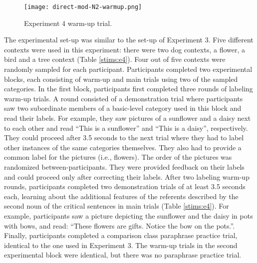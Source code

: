 \begin{figure*}[t]
	\begin{center}
		\texttt{[image: direct-mod-N2-warmup.png]}
	\end{center}
	\vspace{-0.3cm}
	\caption{Experiment 4 warm-up trial.}
	\label{double-mod-N2warmup}
\end{figure*} 
The experimental set-up was similar  to the set-up of Experiment 3. Five different contexts were used in this experiment: there were two dog contexts, a flower, a bird and a tree context (Table \ref{stims:e4}). Four out of five contexts were randomly sampled for each participant.  Participants completed two experimental blocks, each consisting of warm-up and main trials using two of the sampled categories. In the first block, participants first completed three rounds of labeling warm-up trials. A round consisted of a demonstration trial where participants saw two subordinate members of a basic-level category used in this block and read their labels. For example, they saw pictures of a sunflower and a daisy next to each other and read “This is a sunflower” and “This is a daisy”, respectively. They could proceed after 3.5 seconds to the next trial where they had to label other instances of the same categories themselves. They also had to provide a common label for the pictures (i.e., flowers). The order of the pictures was randomized between-participants. They were provided feedback on their labels and could proceed only after correcting their labels.  After two labeling warm-up rounds, participants completed two demonstration trials of at least 3.5 seconds each, learning about the additional features of the referents described by the second noun of the critical sentences in main trials (Table \ref{stims:e4}). For example, participants saw a picture depicting the sunflower and the daisy in pots with bows, and read: “These flowers are gifts. Notice the bow on the pots.”. Finally, participants completed a comparison class paraphrase practice trial, identical to the one used in Experiment 3. The warm-up trials in the second experimental block were identical, but there was no paraphrase practice trial.  

